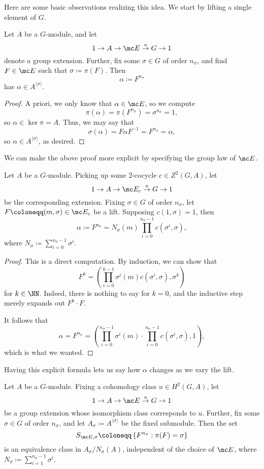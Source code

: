 Here are some basic observations realizing this idea. We start by lifting a single element of $ G$.
\begin{lemma} \label{lem:constructalpha}
	Let $A$ be a $ G$-module, and let 
	\[1\to A\to\mc E\stackrel\pi\to G\to1\]
	denote a group extension. Further, fix some $\sigma\in G$ of order $n_\sigma$, and find $F\in\mc E$ such that $\sigma\coloneqq\pi(F)$. Then
	\[\alpha\coloneqq F^{n_\sigma}\]
	has $\alpha\in A^{\langle\sigma\rangle}$.
\end{lemma}
\begin{proof}
	A priori, we only know that $\alpha\in\mc E$, so we compute
	\[\pi(\alpha)=\pi\left(F^{n_\sigma}\right)=\sigma^{n_\sigma}=1,\]
	so $\alpha\in\ker\pi=A$. Thus, we may say that
	\[\sigma(\alpha)=F\alpha F^{-1}=F^{n_\sigma}=\alpha,\]
	so $\alpha\in A^{\langle\sigma\rangle}$, as desired.
\end{proof}
We can make the above proof more explicit by specifying the group law of $\mc E$.
\begin{lemma} \label{lem:explicitalpha}
	Let $A$ be a $ G$-module. Picking up some $2$-cocycle $c\in Z^2( G,A)$, let
	\[1\to A\to\mc E_c\stackrel\pi\to G\to1\]
	be the corresponding extension. Fixing $\sigma\in G$ of order $n_\sigma$, let $F\coloneqq(m,\sigma)\in\mc E_c$ be a lift. Supposing $c(1,\sigma)=1$, then
	\[\alpha\coloneqq F^{n_\sigma}=N_\sigma(m)\prod_{i=0}^{n_\sigma-1}c\left(\sigma^i,\sigma\right),\]
	where $N_\sigma\coloneqq\sum_{i=0}^{n_\sigma-1}\sigma^i$.
\end{lemma}
\begin{proof}
	This is a direct computation. By induction, we can show that
	\[F^k=\left(\prod_{i=0}^{k-1}\sigma^i(m)c\left(\sigma^i,\sigma\right),\sigma^k\right)\]
	for $k\in\NN$. Indeed, there is nothing to say for $k=0$, and the inductive step merely expands out $F^k\cdot F$.

	It follows that
	\[\alpha=F^{n_\sigma}=\left(\prod_{i=0}^{n_\sigma-1}\sigma^i(m)\cdot\prod_{i=0}^{n_\sigma-1}c\left(\sigma^i,\sigma\right),1\right),\]
	which is what we wanted.
\end{proof}
Having this explicit formula lets us say how $\alpha$ changes as we vary the lift.
\begin{prop} \label{prop:findallalpha}
	Let $A$ be a $ G$-module. Fixing a cohomology class $u\in H^2( G,A)$, let 
	\[1\to A\to\mc E\stackrel\pi\to G\to1\]
	be a group extension whose isomorphism class corresponds to $u$. Further, fix some $\sigma\in G$ of order $n_\sigma$, and let $A_\sigma\coloneqq A^{\langle\sigma\rangle}$ be the fixed submodule. Then the set
	\[S_{\mc E,\sigma}\coloneqq\left\{F^{n_\sigma}:\pi(F)=\sigma\right\}\]
	is an equivalence class in $A_\sigma/N_\sigma(A)$, independent of the choice of $\mc E$, where $N_\sigma\coloneqq\sum_{i=1}^{n_\sigma-1}\sigma^i$.
\end{prop}
